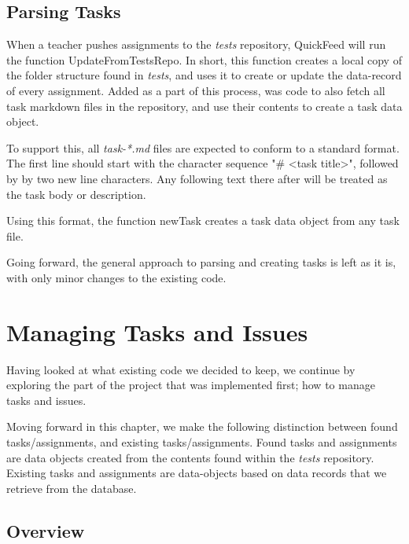 \subsection{Parsing Tasks}
\label{sec:parsing_tasks}

When a teacher pushes assignments to the \textit{tests} repository, QuickFeed will run the function UpdateFromTestsRepo.
In short, this function creates a local copy of the folder structure found in \textit{tests}, and uses it to create or update the data-record of every assignment.
Added as a part of this process, was code to also fetch all task markdown files in the repository, and use their contents to create a task data object.

To support this, all \textit{task-*.md} files are expected to conform to a standard format.
The first line should start with the character sequence "\# <task title>", followed by by two new line characters.
Any following text there after will be treated as the task body or description.

Using this format, the function newTask creates a task data object from any task file.



Going forward, the general approach to parsing and creating tasks is left as it is, with only minor changes to the existing code.

\section{Managing Tasks and Issues}

Having looked at what existing code we decided to keep, we continue by exploring the part of the project that was implemented first; how to manage tasks and issues.

Moving forward in this chapter, we make the following distinction between found tasks/assignments, and existing tasks/assignments.
Found tasks and assignments are data objects created from the contents found within the \textit{tests} repository.
Existing tasks and assignments are data-objects based on data records that we retrieve from the database.

\subsection{Overview}

